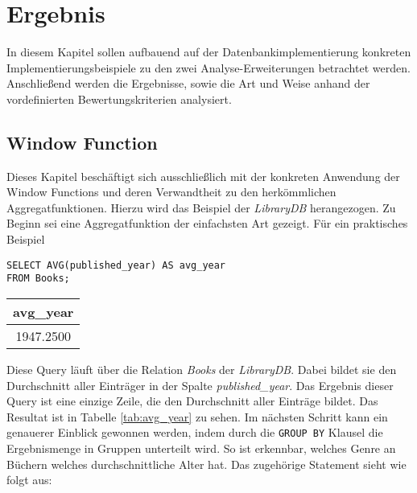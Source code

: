 \chapter{Ergebnis}
In diesem Kapitel sollen aufbauend auf der Datenbankimplementierung konkreten Implementierungsbeispiele
zu den zwei Analyse-Erweiterungen betrachtet werden. Anschließend werden die
Ergebnisse, sowie die Art und Weise anhand der vordefinierten Bewertungskriterien
analysiert.

\section{Window Function}
Dieses Kapitel beschäftigt sich ausschließlich mit der konkreten Anwendung der Window
Functions und deren Verwandtheit zu den herkömmlichen Aggregatfunktionen. Hierzu
wird das Beispiel der \textit{LibraryDB} herangezogen. Zu Beginn sei eine
Aggregatfunktion der einfachsten Art gezeigt. Für ein praktisches Beispiel

\begin{minipage}{0.68\textwidth}
	 \begin{lstlisting}
SELECT AVG(published_year) AS avg_year
FROM Books;
	\end{lstlisting}
\end{minipage}
\hfill
\begin{minipage}{0.28\textwidth}
	\centering
	\begin{tabular}{|c|}
		\hline
		\textbf{avg\_year} \\
		\hline
		1947.2500          \\
		\hline
	\end{tabular}
	 \label{tab:avg_year}
\end{minipage}

Diese Query läuft über die Relation \textit{Books} der \textit{LibraryDB}. Dabei
bildet sie den Durchschnitt aller Einträger in der Spalte \textit{published\_year}.
Das Ergebnis dieser Query ist eine einzige Zeile, die den Durchschnitt aller Einträge
bildet. Das Resultat ist in Tabelle \ref{tab:avg_year} zu sehen. Im nächsten Schritt
kann ein genauerer Einblick gewonnen werden, indem durch die \texttt{GROUP BY} Klausel
die Ergebnismenge in Gruppen unterteilt wird. So ist erkennbar, welches Genre an
Büchern welches durchschnittliche Alter hat. Das zugehörige Statement sieht wie
folgt aus:

